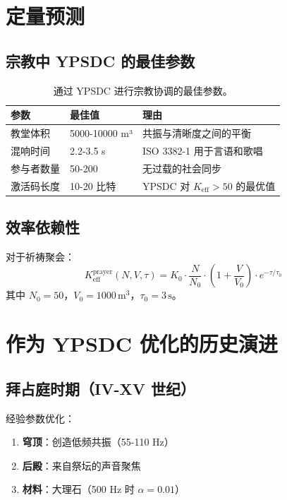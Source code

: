 \documentclass[12pt,a4paper]{article}
\begin{document}
	\section{定量预测}
	
	\subsection{宗教中 YPSDC 的最佳参数}
	
	\begin{table}[h]
		\centering
		\begin{tabular}{p{}p{}p{}}
			\toprule
			\textbf{参数} & \textbf{最佳值} & \textbf{理由} \\
			\midrule
			教堂体积 & 5000-10000 m³ & 共振与清晰度之间的平衡 \\
			混响时间 & 2.2-3.5 s & ISO 3382-1 用于言语和歌唱 \\
			参与者数量 & 50-200 & 无过载的社会同步 \\
			激活码长度 & 10-20 比特 & YPSDC 对 $K_{\mathrm{eff}} > 50$ 的最优值 \\
			\bottomrule
		\end{tabular}
		\caption{通过 YPSDC 进行宗教协调的最佳参数。}
		\label{tab:optimal-params}
	\end{table}
	
	\subsection{效率依赖性}
	
	对于祈祷聚会：
	\[
	K_{\mathrm{eff}}^{\mathrm{prayer}}(N, V, \tau) = K_0 \cdot \frac{N}{N_0} \cdot \left(1 + \frac{V}{V_0}\right) \cdot e^{-\tau/\tau_0}
	\]
	其中 $N_0 = 50$，$V_0 = 1000 \, \mathrm{m}^3$，$\tau_0 = 3 \, \mathrm{s}$。
	
	\section{作为 YPSDC 优化的历史演进}
	
	\subsection{拜占庭时期（IV-XV 世纪）}
	
	经验参数优化：
	\begin{enumerate}
		\item \textbf{穹顶}：创造低频共振（55-110 Hz）
		\item \textbf{后殿}：来自祭坛的声音聚焦
		\item \textbf{材料}：大理石（500 Hz 时 $\alpha = 0.01$）
	\end{enumerate}
	
\end{document}
